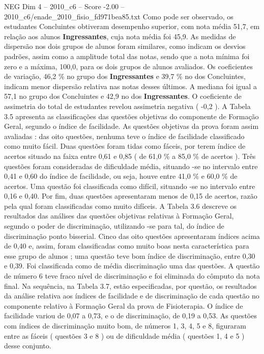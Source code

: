 \begin{textsample}{NEG Dim 4 – 2010\_c6 – Score -2.00 – 2010\_c6/enade\_2010\_fisio\_fd971bea85.txt}
Como pode ser observado, os estudantes Concluintes obtiveram desempenho superior, com nota média 51,7, em relação aos alunos \textbf{Ingressantes}, cuja nota média foi 45,9.
As medidas de dispersão nos dois grupos de alunos foram similares, como indicam os desvios padrões, assim como a amplitude total das notas, sendo que a nota mínima foi zero e a máxima, 100,0, para os dois grupos de alunos avaliados.
Os coeficientes de variação, 46,2 \% no grupo dos \textbf{Ingressantes} e 39,7 \% no dos Concluintes, indicam menor dispersão relativa nas notas desses últimos.
A mediana foi igual a 57,1 no grupo dos Concluintes e 42,9 no dos \textbf{Ingressantes}.
O coeficiente de assimetria do total de estudantes revelou assimetria negativa ( -0,2 ).
A Tabela 3.5 apresenta as classificações das questões objetivas do componente de Formação Geral, segundo o índice de facilidade.
As questões objetivas da prova foram assim avaliadas : das oito questões, nenhuma teve o índice de facilidade classificado como muito fácil.
Duas questões foram tidas como fáceis, por terem índice de acertos situado na faixa entre 0,61 e 0,85 ( de 61,0 \% a 85,0 \% de acertos ).
Três questões foram consideradas de dificuldade média, situando -se no intervalo entre 0,41 e 0,60 do índice de facilidade, ou seja, houve entre 41,0 \% e 60,0 \% de acertos.
Uma questão foi classificada como difícil, situando -se no intervalo entre 0,16 e 0,40.
Por fim, duas questões apresentaram menos de 0,15 de acertos, razão pela qual foram classificadas como muito difíceis.
A Tabela 3.6 descreve os resultados das análises das questões objetivas relativas à Formação Geral, segundo o poder de discriminação, utilizando -se para tal, do índice de discriminação ponto bisserial.
Cinco das oito questões apresentaram índices acima de 0,40 e, assim, foram classificadas como muito boas nesta característica para esse grupo de alunos ; uma questão teve bom índice de discriminação, entre 0,30 e 0,39.
Foi classificada como de média discriminação uma das questões.
A questão de número 6 teve fraco nível de discriminação e foi eliminada do cômputo da nota final.
Na sequência, na Tabela 3.7, estão especificadas, por questão, os resultados da análise relativa aos índices de facilidade e de discriminação de cada questão no componente relativo à Formação Geral da prova de Fisioterapia.
O índice de facilidade variou de 0,07 a 0,73, e o de discriminação, de 0,19 a 0,53.
As questões com índices de discriminação muito bom, de números 1, 3, 4, 5 e 8, figuraram entre as fáceis ( questões 3 e 8 ) ou de dificuldade média ( questões 1, 4 e 5 ) desse conjunto.

\end{textsample}
